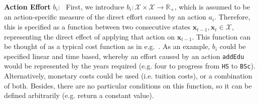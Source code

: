 \documentclass[runningheads, envcountsame, a4paper]{llncs}
\newcommand{\R}{\mathbb{R}}
\newcommand{\action}{a}
\newcommand{\state}{\mathbf{x}}
\newcommand{\featurespace}{\mathcal{X}}
\newcommand{\baseCosts}{b}
\begin{document}
\textbf{Action Effort} $\baseCosts_i$: \,
First, we introduce $\baseCosts_i: \featurespace \times \featurespace \to \R_+$, which is assumed to be an action-specific measure of the direct effort caused by an action $\action_i$. Therefore, this is specified as a function between two consecutive states $\state_{t-1}, \state_t \in \featurespace$, representing the direct effect of applying that action on $\state_{t-1}$. This function can be thought of as a typical cost function as in e.g.~\cite{ramakrishnanSynthesizingActionSequences2020}.
As an example, $\baseCosts_i$ could be specified linear and time based, whereby an effort caused by an action \texttt{addEdu} would be represented by the years required (e.g. four to progress from \texttt{HS} to \texttt{BSc}). Alternatively, monetary costs could be used (i.e. tuition costs), or a combination of both.
Besides, there are no particular conditions on this function, so it can be defined arbitrarily (e.g. return a constant value).
\end{document}

